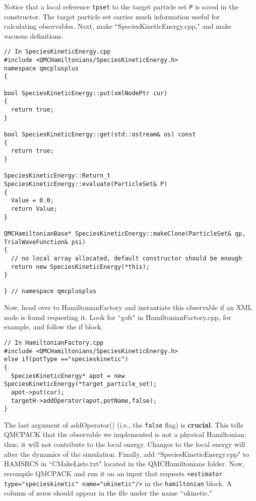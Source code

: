 Notice that a local reference \verb|tpset| to the target particle set \verb|P| is saved in the constructor. The target particle set carries much information useful for calculating observables. Next, make ``SpeciesKineticEnergy.cpp," and make vacuous definitions.
\begin{lstlisting}[style=C++]
// In SpeciesKineticEnergy.cpp
#include <QMCHamiltonians/SpeciesKineticEnergy.h>
namespace qmcplusplus
{

bool SpeciesKineticEnergy::put(xmlNodePtr cur)
{
  return true;
} 

bool SpeciesKineticEnergy::get(std::ostream& os) const
{ 
  return true;
}

SpeciesKineticEnergy::Return_t SpeciesKineticEnergy::evaluate(ParticleSet& P)
{
  Value = 0.0;
  return Value;
}

QMCHamiltonianBase* SpeciesKineticEnergy::makeClone(ParticleSet& qp, TrialWaveFunction& psi)
{
  // no local array allocated, default constructor should be enough
  return new SpeciesKineticEnergy(*this);
}

} // namespace qmcplusplus
\end{lstlisting}

Now, head over to HamiltonianFactory and instantiate this observable if an XML node is found requesting it. Look for ``gofr" in HamiltonianFactory.cpp, for example, and follow the if block.
\begin{lstlisting}[style=C++]
// In HamiltonianFactory.cpp
#include <QMCHamiltonians/SpeciesKineticEnergy.h>
else if(potType =="specieskinetic")
{        
  SpeciesKineticEnergy* apot = new SpeciesKineticEnergy(*target_particle_set);
  apot->put(cur);
  targetH->addOperator(apot,potName,false);
}
\end{lstlisting}
The last argument of addOperator() (i.e., the \verb|false| flag) is \textbf{crucial}. This tells QMCPACK that the observable we implemented is not a physical Hamiltonian; thus, it will not contribute to the local energy. Changes to the local energy will alter the dynamics of the simulation. Finally, add ``SpeciesKineticEnergy.cpp" to HAMSRCS in ``CMakeLists.txt" located in the QMCHamiltonians folder. Now, recompile QMCPACK and run it on an input that requests \verb|<estimator type="specieskinetic" name="ukinetic"/>| in the \verb|hamiltonian| block. A column of zeros should appear in the  file under the name ``ukinetic."

